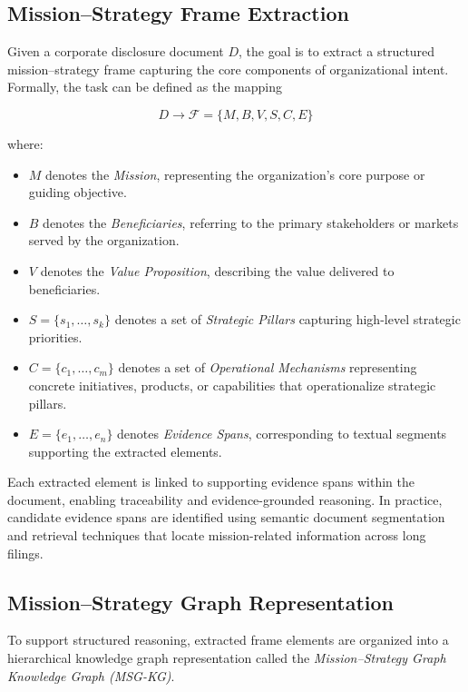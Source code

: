 \documentclass[11pt]{article}
\begin{document}
\subsection{Mission--Strategy Frame Extraction}

Given a corporate disclosure document $D$, the goal is to extract a structured mission--strategy frame capturing the core components of organizational intent. Formally, the task can be defined as the mapping

\begin{equation}
D \rightarrow \mathcal{F} = \{M, B, V, S, C, E\}
\end{equation}

where:

\begin{itemize}[leftmargin=1.0em, itemsep=0.05em, topsep=0.05em]
\item $M$ denotes the \textit{Mission}, representing the organization’s core purpose or guiding objective.
\item $B$ denotes the \textit{Beneficiaries}, referring to the primary stakeholders or markets served by the organization.
\item $V$ denotes the \textit{Value Proposition}, describing the value delivered to beneficiaries.
\item $S = \{s_1, \ldots, s_k\}$ denotes a set of \textit{Strategic Pillars} capturing high-level strategic priorities.
\item $C = \{c_1, \ldots, c_m\}$ denotes a set of \textit{Operational Mechanisms} representing concrete initiatives, products, or capabilities that operationalize strategic pillars.
\item $E = \{e_1, \ldots, e_n\}$ denotes \textit{Evidence Spans}, corresponding to textual segments supporting the extracted elements.
\end{itemize}

Each extracted element is linked to supporting evidence spans within the document, enabling traceability and evidence-grounded reasoning. In practice, candidate evidence spans are identified using semantic document segmentation and retrieval techniques that locate mission-related information across long filings.

\subsection{Mission--Strategy Graph Representation}

To support structured reasoning, extracted frame elements are organized into a hierarchical knowledge graph representation called the \textit{Mission--Strategy Graph Knowledge Graph (MSG-KG)}.
\end{document}
